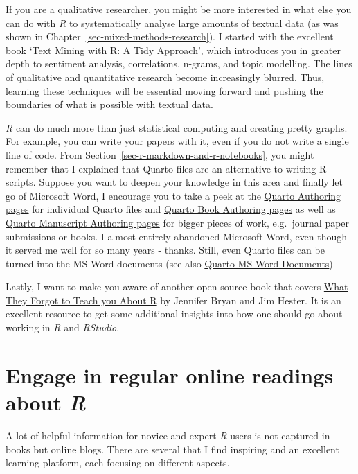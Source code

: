 \documentclass[
  letterpaper,
  DIV=11,
  numbers=noendperiod]{scrreprt}
\begin{document}
If you are a qualitative researcher, you might be more interested in
what else you can do with \emph{R} to systematically analyse large
amounts of textual data (as was shown in
Chapter~\ref{sec-mixed-methods-research}). I started with the excellent
book \href{https://www.tidytextmining.com}{`Text Mining with R: A Tidy
Approach'}, which introduces you in greater depth to sentiment analysis,
correlations, n-grams, and topic modelling. The lines of qualitative and
quantitative research become increasingly blurred. Thus, learning these
techniques will be essential moving forward and pushing the boundaries
of what is possible with textual data.

\emph{R} can do much more than just statistical computing and creating
pretty graphs. For example, you can write your papers with it, even if
you do not write a single line of code. From
Section~\ref{sec-r-markdown-and-r-notebooks}, you might remember that I
explained that Quarto files are an alternative to writing R scripts.
Suppose you want to deepen your knowledge in this area and finally let
go of Microsoft Word, I encourage you to take a peek at the
\href{https://quarto.org/docs/authoring/markdown-basics.html}{Quarto
Authoring pages} for individual Quarto files and
\href{https://quarto.org/docs/books/}{Quarto Book Authoring pages} as
well as \href{https://quarto.org/docs/manuscripts/}{Quarto Manuscript
Authoring pages} for bigger pieces of work, e.g.~journal paper
submissions or books. I almost entirely abandoned Microsoft Word, even
though it served me well for so many years - thanks. Still, even Quarto
files can be turned into the MS Word documents (see also
\href{https://quarto.org/docs/output-formats/ms-word.html}{Quarto MS
Word Documents})

Lastly, I want to make you aware of another open source book that covers
\href{https://rstats.wtf}{What They Forgot to Teach you About R} by
Jennifer Bryan and Jim Hester. It is an excellent resource to get some
additional insights into how one should go about working in \emph{R} and
\emph{RStudio}.

\section{\texorpdfstring{Engage in regular online readings about
\emph{R}}{Engage in regular online readings about R}}\label{sec-next-steps-online-readings}

A lot of helpful information for novice and expert \emph{R} users is not
captured in books but online blogs. There are several that I find
inspiring and an excellent learning platform, each focusing on different
aspects.
\end{document}
